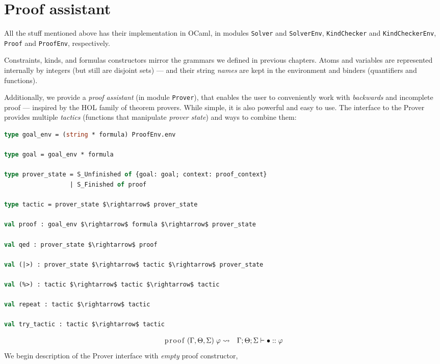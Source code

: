 \documentclass[english, mgr]{iithesis}
\renewcommand{\tt}[1]{\texttt{\small{#1}}}
\renewcommand{\it}[1]{\textit{#1}}
\begin{document}
\chapter{Proof assistant}
All the stuff mentioned above has their implementation in OCaml,
in modules \tt{Solver} and \tt{SolverEnv},
\tt{KindChecker} and \tt{KindCheckerEnv},
\tt{Proof} and \tt{ProofEnv}, respectively.

Constraints, kinds, and formulas constructors mirror the grammars we defined
in previous chapters.
Atoms and variables are represented internally by integers (but still are disjoint sets)
--- and their string \it{names} are kept in the environment and binders
(quantifiers and functions).

Additionally, we provide a \it{proof assistant} (in module \tt{Prover}),
that enables the user to conveniently work with \it{backwards} and incomplete
proof --- inspired by the HOL family of theorem provers.
While simple, it is also powerful and easy to use.
The interface to the Prover provides multiple \it{tactics}
(functions that manipulate \it{prover state}) and ways to combine them:
\begin{lstlisting}[mathescape, language=OCaml]
type goal_env = (string * formula) ProofEnv.env

type goal = goal_env * formula

type prover_state = S_Unfinished of {goal: goal; context: proof_context}
                  | S_Finished of proof

type tactic = prover_state $\rightarrow$ prover_state

val proof : goal_env $\rightarrow$ formula $\rightarrow$ prover_state

val qed : prover_state $\rightarrow$ proof

val (|>) : prover_state $\rightarrow$ tactic $\rightarrow$ prover_state

val (%>) : tactic $\rightarrow$ tactic $\rightarrow$ tactic

val repeat : tactic $\rightarrow$ tactic

val try_tactic : tactic $\rightarrow$ tactic
\end{lstlisting}
\newcommand{\hole}{\ensuremath{\bullet}}
\begin{eqnarray*}
  \text{\lstinline[columns=fixed]{proof}}\;(\Gamma,\Theta,\Sigma)\;\formphi &  \leadsto & \jgmnt[\Gamma; \Theta; \Sigma]{\hole\ofkind\formphi}
  \end{eqnarray*}
We begin description of the Prover interface with \it{empty} proof constructor,
\end{document}
